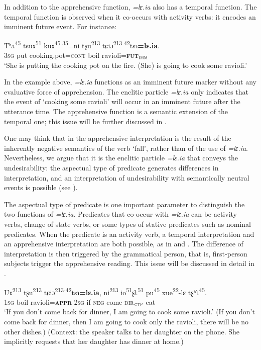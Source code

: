 \documentclass[output=paper,colorlinks,citecolor=brown, language=chinese]{langscibook}
\begin{document}
In addition to the apprehensive function, \textit{=lɛ.ia} also has a temporal function. The temporal function is observed when it co-occurs with activity verbs: it encodes an imminent future event. For instance:

\ea\label{ex:Song15}
\gll Tʰa\textsuperscript{45} tsuɤ\textsuperscript{51} kuɤ\textsuperscript{45-35}=ni tʂu\textsuperscript{213} tɕiɔ\textsuperscript{213-42}tsɿ\textbf{=lɛ.ia}. \\
\textsc{3sg} put cooking.pot=\textsc{cont} boil ravioli=\textsc{\textbf{fut$_{\textsc{imm}}$}} \\
\glt `She is putting the cooking pot on the fire. (She) is going to cook some ravioli.'
\z

\noindent In the example above, \textit{=lɛ.ia} functions as an imminent future marker without any evaluative force of apprehension. The enclitic particle \textit{=lɛ.ia} only indicates that the event of `cooking some ravioli' will occur in an imminent future after the utterance time. The apprehensive function is a semantic extension of the temporal one; this issue will be further discussed in .

One may think that in  the apprehensive interpretation is the result of the inherently negative semantics of the verb `fall', rather than of the use of \textit{=lɛ.ia}. Nevertheless, we argue that it is the enclitic particle \textit{=lɛ.ia} that conveys the undesirability: the aspectual type of predicate generates differences in interpretation, and an interpretation of undesirability with semantically neutral events is possible (see ).

The aspectual type of predicate is one important parameter to distinguish the two functions of \textit{=lɛ.ia}. Predicates that co-occur with \textit{=lɛ.ia} can be activity verbs, change of state verbs, or some types of stative predicates such as nominal predicates. When the predicate is an activity verb, a temporal interpretation and an apprehensive interpretation are both possible, as in  and . The difference of interpretation is then triggered by the grammatical person, that is, first-person subjects trigger the apprehensive reading. This issue will be discussed in detail in .

\ea\label{ex:Song16}
\gll Uɤ\textsuperscript{213} tʂu\textsuperscript{213} tɕiɔ\textsuperscript{213-42}tsɿ\textbf{=lɛ.ia}, ni\textsuperscript{213} io\textsuperscript{51}ʂʅ\textsuperscript{51}  pu\textsuperscript{45} xue\textsuperscript{22}-lɛ tʂʰʅ\textsuperscript{45}. \\
\textsc{1sg} boil ravioli=\textsc{\textbf{appr}} \textsc{2sg} if \textsc{neg} come-\textsc{dir$_{\textsc{ctp}}$} eat \\
\glt `If you don't come back for dinner, I am going to cook some ravioli.' (If you don't come back for dinner, then I am going to cook only the ravioli, there will be no other dishes.) (Context: the speaker talks to her daughter on the phone. She implicitly requests that her daughter has dinner at home.)
\z
\end{document}
